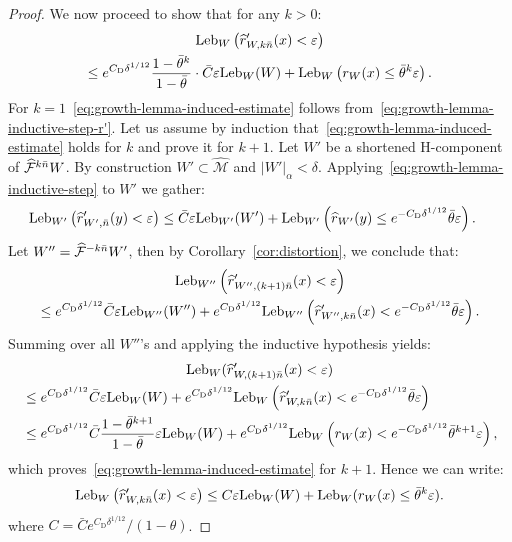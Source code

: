 \documentclass[10pt]{amsart}
\theoremstyle{definition}\newtheorem{defi}[theo]{Definition}\newtheorem{rema}[theo]{Remark}\newtheorem{exam}[theo]{Example}\newtheorem{exem}[theo]{Example}\newtheorem{nota}[theo]{Notation}
\newcommand{\eps}{\varepsilon}
\newcommand{\ifrac}[2]{#1/#2}
\newcommand{\cm}{\mathcal{F}}
\newcommand{\csp}{\mathcal{M}}
\newcommand{\cmp}{\hat\cm}
\newcommand{\cspi}{\widehat{\csp}}
\newcommand{\adm}{_{\alpha^{+}}}
\newcommand{\Leb}{\textup{Leb}}
\newcommand{\Cdist}{C_\mathrm{D}}
\renewcommand{\adm}{_{\alpha}}
\let\oldhat\hat
\renewcommand*{\hat}[1]{\mathchoice{\widehat{#1}}{\widehat{#1}}{\oldhat{#1}}{\oldhat{#1}}}
\begin{document}
\begin{proof}
We now proceed to show that for any $k > 0$:
\begin{multline}\label{eq:growth-lemma-induced-estimate}
\Leb_{W}\left(\hat r'_{W,k\bar n}(x) < \eps\right) \\
\le e^{\Cdist\delta^{1/12}}\frac{1-\bar\theta^{k}}{1-\bar\theta}\cdot
\bar C\eps\Leb_{W}(W)+ \Leb_{W}\left(r_{W}(x) \le\bar \theta^{k}\eps\right).
\end{multline}
For $k = 1$~\eqref{eq:growth-lemma-induced-estimate} follows from~\eqref{eq:growth-lemma-inductive-step-r'}. Let us assume by induction that~\eqref{eq:growth-lemma-induced-estimate} holds for $k$ and prove it for $k+1$. Let $W' $ be a shortened H-component of $\cmp^{k\bar n} W$. By construction $W'\subset\cspi$ and $|W'|\adm < \delta$. Applying~\eqref{eq:growth-lemma-inductive-step} to $W'$ we gather:
\begin{align*}
\Leb_{W'}\left(\hat r'_{W',\bar n}(y) < \eps\right) &\le \bar C\eps\Leb_{W'}(W') +
\Leb_{W'}\left(\hat r_{W'}(y)\le e^{-\Cdist\delta^{1/12}}\bar\theta\eps\right).
\end{align*}
Let $W'' = \cmp^{-k\bar n} W'$, then by Corollary~\ref{cor:distortion}, we conclude that:
\begin{multline*}
\Leb_{W''}\left(\hat r'_{W'',(k+1)\bar n}(x) < \eps\right) \\
\le e^{\Cdist\delta^{1/12}}\bar C\eps\Leb_{W''}(W'')
 + e^{\Cdist\delta^{1/12}}\Leb_{W''} \left(\hat r'_{W'',k\bar n}(x) < e^{-\Cdist\delta^{1/12}}\bar \theta\eps\right).
\end{multline*}
Summing over all $W''$'s and applying the inductive hypothesis yields:
\begin{multline*}
\Leb_{W}(\hat r'_{W,(k+1)\bar n}(x) < \eps) 
\\
\begin{aligned}
&\le e^{\Cdist\delta^{1/12}}\bar C\eps\Leb_{W}(W)+
e^{\Cdist\delta^{1/12}}\Leb_{W}
\left(\hat r'_{W,k\bar n}(x) < e^{-\Cdist\delta^{1/12}}\bar\theta\eps\right) 
\\
&\le
e^{\Cdist\delta^{1/12}}\bar C\frac{1-\bar\theta^{k+1}}{1-\bar\theta}\eps\Leb_{W}(W)+
e^{\Cdist\delta^{1/12}}\Leb_{W} \left(r_{W}(x) < e^{-\Cdist\delta^{1/12}}\bar\theta^{k+1}\eps\right),
\end{aligned}
\end{multline*}
which proves~\eqref{eq:growth-lemma-induced-estimate} for $k+1$. Hence we can write:
\begin{align}\label{eq:growth-lemma-final-estimate}
\Leb_{W}\left(\hat r'_{W,k\bar n}(x) < \eps\right)\le C\eps\Leb_{W}(W)+\Leb_{W}(r_{W}(x) \le \bar\theta^{k}\eps).
\end{align}
where $C = \ifrac{\bar C e^{\Cdist\delta^{1/12}}}{(1-\theta)}$.


\end{proof}
\end{document}
